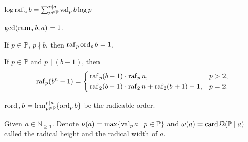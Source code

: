 \begin{proposition}
    $\log \operatorname{raf}_{a}b = \sum_{p\in\mathbb{P}}^{p \mid a} \operatorname{val}_{p}b \log p$
\end{proposition}
\begin{proposition}\label{prop:rem-coprimality}
    $\gcd(\operatorname{ram}_{a}b, a) = 1$.
\end{proposition}
\begin{proposition}\label{prop:raf-ord-non-self-divisibility}
    If $p \in \mathbb{P}$, $p\nmid b$, then $\operatorname{raf}_{p}\operatorname{ord}_{p}b = 1$.
\end{proposition}
\begin{theorem}\label{thm:lte-radical-theorem}
    If $p \in \mathbb{P}$ and $p\mid (b - 1)$, then
    \[\operatorname{raf}_{p}(b^{n} - 1) = \left\{ \begin{aligned}
        &\operatorname{raf}_{p}(b - 1) \cdot \operatorname{raf}_{p}n, & p > 2, \\
        &\operatorname{raf}_{2}(b - 1) \cdot \operatorname{raf}_{2}n + \operatorname{raf}_{2}(b + 1) - 1, & p = 2.
    \end{aligned} \right.\]
\end{theorem}

\begin{definition}\label{def:radicable-order}
    $\operatorname{rord}_{a} b = \operatorname*{lcm}_{p\in\mathbb{P}}^{p\mid a} \{\operatorname{ord}_{p} b\}$ be the radicable order.
\end{definition}

\begin{definition}\label{def:radical-height-and-width}
    Given $a \in \mathbb{N}_{\ge 1}$. Denote $\nu(a) = \max\{ \operatorname{val}_{p} a \mid p\in\mathbb{P}\}$ and $\omega(a) = \operatorname*{card}\Omega(\mathbb{P}\mid a)$ called the radical height and the radical width of $a$.
\end{definition}

